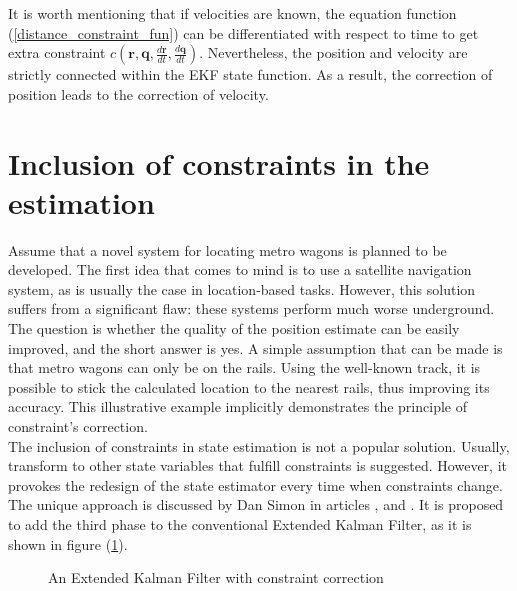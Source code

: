 It is worth mentioning that if velocities are known, the equation function (\ref{distance_constraint_fun}) can be differentiated with respect to time to get extra constraint $c(\bm{r}, \bm{q}, \frac{d\bm{r}}{dt}, \frac{d\bm{q}}{dt})$. Nevertheless, the position and velocity are strictly connected within the EKF state function. As a result, the correction of position leads to the correction of velocity.


\section{Inclusion of constraints in the estimation}

Assume that a novel system for locating metro wagons is planned to be developed. The first idea that comes to mind is to use a satellite navigation system, as is usually the case in location-based tasks. However, this solution suffers from a significant flaw: these systems perform much worse underground. The question is whether the quality of the position estimate can be easily improved, and the short answer is yes. A simple assumption that can be made is that metro wagons can only be on the rails. Using the well-known track, it is possible to stick the calculated location to the nearest rails, thus improving its accuracy.
This illustrative example implicitly demonstrates the principle of constraint's correction.\\

The inclusion of constraints in state estimation is not a popular solution. Usually, transform to other state variables that fulfill constraints is suggested. However, it provokes the redesign of the state estimator every time when constraints change. The unique approach is discussed by Dan Simon in articles \cite{simon}, \cite{simon2010kalman} and \cite{simon2006kalman}. It is proposed to add the third phase to the conventional Extended Kalman Filter, as it is shown in figure (\ref{ekf_three_phases}).

\begin{figure}[!h]
	\begin{center}
	\end{center}
	\caption{An Extended Kalman Filter with constraint correction}
	\label{ekf_three_phases}
\end{figure}

